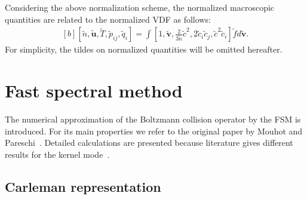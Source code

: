 Considering the above normalization scheme, the normalized macroscopic quantities are related to the normalized VDF as follows:
\begin{equation}
\begin{aligned}[b]
[\widetilde{n},\widetilde{\bm{u}}, \widetilde{T}, \widetilde{p}_{ij}, \widetilde{q}_{i}]
=\int \left[1,\widetilde{\bm{v}},\frac{2}{3\widetilde{n}}\widetilde{c}^2, 2\widetilde{c}_i\widetilde{c}_j,\widetilde{c}^2\widetilde{c}_i\right]
\widetilde{f}d\widetilde{\bm{v}}.
\end{aligned}
\end{equation}
For simplicity, the tildes on normalized quantities will be omitted hereafter. 


\section{Fast spectral method}\label{single_carleman}

The numerical approximation of the Boltzmann collision operator by the FSM is introduced. For its main properties we refer to the original paper by Mouhot and Pareschi~\cite{Mouhot2006}. Detailed calculations are presented because literature gives different results for the kernel mode~\cite{Mouhot2006,Filbet2006,Hu2012}.





\subsection{Carleman representation}\label{Carleman_FSM_monatomic}


